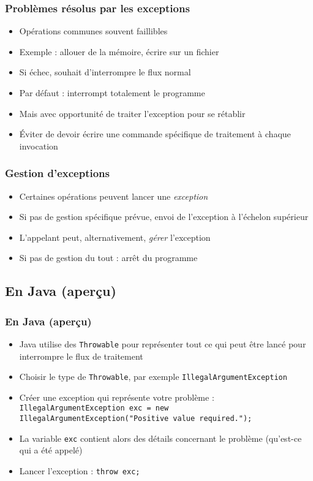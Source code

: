 \documentclass[english, french]{beamer}
\begin{document}
\begin{frame}
	\frametitle{Problèmes résolus par les exceptions}
	\begin{itemize}
		\item Opérations communes souvent faillibles
		\item Exemple : allouer de la mémoire, écrire sur un fichier
		\item Si échec, souhait d’interrompre le flux normal
		\item Par défaut : interrompt totalement le programme
		\item Mais avec opportunité de traiter l’exception pour se rétablir
		\item Éviter de devoir écrire une commande spécifique de traitement à chaque invocation
	\end{itemize}
\end{frame}

\begin{frame}
	\frametitle{Gestion d’exceptions}
	\begin{itemize}
		\item Certaines opérations peuvent lancer une \emph{exception}
		\item Si pas de gestion spécifique prévue, envoi de l’exception à l’échelon supérieur
		\item L’appelant peut, alternativement, \emph{gérer} l’exception
		\item Si pas de gestion du tout : arrêt du programme
	\end{itemize}
\end{frame}

\subsection{En Java (aperçu)}
\begin{frame}
	\frametitle{En Java (aperçu)}
	\begin{itemize}
		\item Java utilise des \texttt{Throwable} pour représenter tout ce qui peut être lancé pour interrompre le flux de traitement
		\item Choisir le type de \texttt{Throwable}, par exemple \texttt{IllegalArgumentException}
		\item Créer une exception qui représente votre problème : \texttt{IllegalArgumentException exc = new IllegalArgumentException("Positive value required.");}
		\item La variable \texttt{exc} contient alors des détails concernant le problème (qu’est-ce qui a été appelé)
		\item Lancer l’exception : \texttt{throw exc;}
	\end{itemize}
\end{frame}
\end{document}
